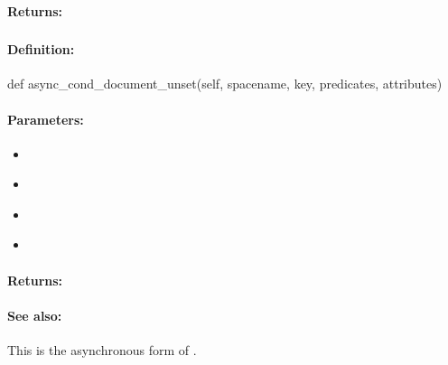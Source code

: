 \paragraph{Returns:}


\pagebreak
\subsubsection{}
\label{api:python:async_cond_document_unset}


\paragraph{Definition:}
\begin{pythoncode}
def async_cond_document_unset(self, spacename, key, predicates, attributes)
\end{pythoncode}

\paragraph{Parameters:}
\begin{itemize}[noitemsep]
\item {}\\

\item {}\\

\item {}\\

\item {}\\

\end{itemize}

\paragraph{Returns:}


\paragraph{See also:}  This is the asynchronous form of .

